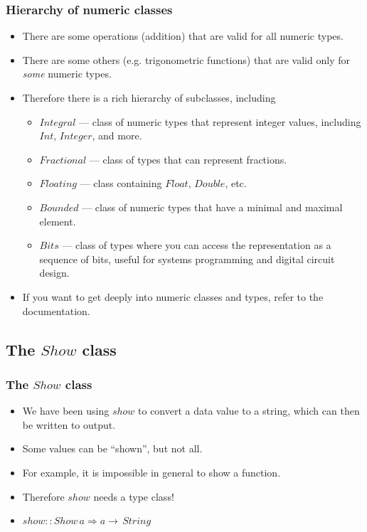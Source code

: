 \documentclass{beamer}
\begin{document}
\begin{frame}[fragile]
\frametitle{Hierarchy of numeric classes}

\begin{itemize}
\item There are some operations (addition) that are valid for all
  numeric types.
\item There are some others (e.g. trigonometric functions) that are
  valid only for \emph{some} numeric types.
\item Therefore there is a rich hierarchy of subclasses, including
  \begin{itemize}
  \item $Integral$ --- class of numeric types that represent
    integer values, including $Int$, $Integer$, and more.
  \item $Fractional$ --- class of types that can represent fractions.
  \item $Floating$ --- class containing $Float$, $Double$, etc.
  \item $Bounded$ --- class of numeric types that have a minimal
    and maximal element.
  \item $Bits$ --- class of types where you can access the
    representation as a sequence of bits, useful for systems
    programming and digital circuit design.
  \end{itemize}
\item If you want to get deeply into numeric classes and types,
  refer to the documentation.
\end{itemize}

\end{frame}

\subsection{The $Show$ class}

\begin{frame}[fragile]
\frametitle{The $Show$ class}

\begin{itemize}
\item We have been using $show$ to convert a data value to a
  string, which can then be written to output.
\item Some values can be ``shown'', but not all.
\item For example, it is impossible in general to show a function.
\item Therefore $show$ needs a type class!
\item $show :: Show\, a \Rightarrow a \rightarrow \,String$
\end{itemize}

\end{frame}
\end{document}
